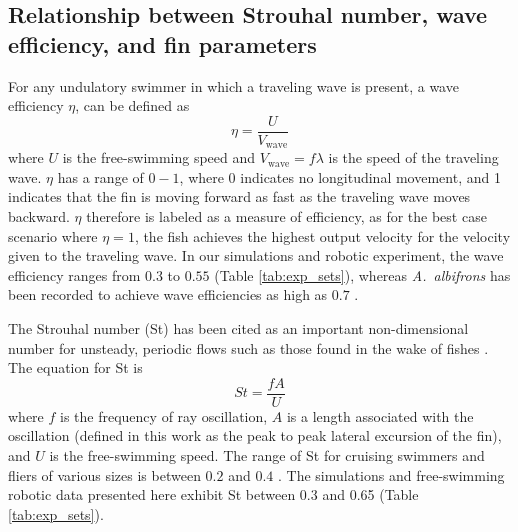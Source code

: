 \documentclass[onecolumn]{IEEEtran}
\newcommand{\albif}{{\it A.~albifrons}}
\begin{document}
\begin{comment}
\end{comment}

\subsection{Relationship between Strouhal number, wave efficiency, and fin parameters}

For any undulatory swimmer in which a traveling wave is present, a wave
efficiency $\eta$, can be defined as
\begin{equation} \eta = \frac{U}{V_\text{wave}} \label{eq:wave_efficiency}
\end{equation}
where $U$ is the free-swimming speed and $V_\text{wave} = f \lambda$ is the
speed of the traveling wave. $\eta$ has a range of $0 - 1$, where 0
indicates no longitudinal movement, and 1 indicates that the fin is moving
forward as fast as the traveling wave moves backward. $\eta$ therefore is
labeled as a measure of efficiency, as for the best case scenario where
$\eta = 1$, the fish achieves the highest output velocity for the
velocity given to the traveling wave. In our
simulations and robotic experiment, the wave efficiency ranges from $0.3$
to $0.55$ (Table \ref{tab:exp_sets}), whereas \albif{} has been recorded to
achieve wave efficiencies as high as $0.7$ \citep*{Ruiz13a}.

The Strouhal number (St) has been cited as an important non-dimensional
number for unsteady, periodic flows such as those found in the wake of
fishes \citep{Triantafyllou91,Laud06c}. The equation for St is
\begin{equation} St = \frac{f A}{U} \label{eq:strouhal}
\end{equation}
where $f$ is the frequency of ray oscillation, $A$ is a length associated
with the oscillation (defined in this work as the peak to peak
lateral excursion of the fin), and $U$ is the free-swimming speed. The
range of St for cruising swimmers and fliers of various sizes is between
$0.2$ and $0.4$ \citep*{Tayl03a}. The simulations and free-swimming robotic data
presented here exhibit St between 0.3 and 0.65 (Table
\ref{tab:exp_sets}).
\end{document}
